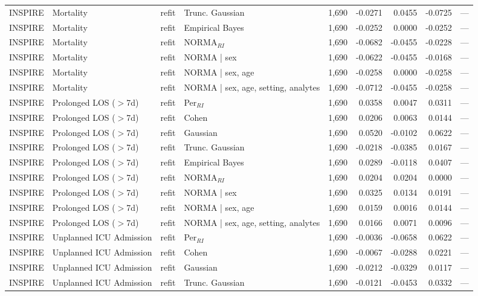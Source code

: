 \begin{table}[ht]
\begin{tabular}{ll l l r r r r r}
INSPIRE & Mortality & refit & Trunc. Gaussian & 1,690 & -0.0271 & 0.0455 & -0.0725 & --- \\
INSPIRE & Mortality & refit & Empirical Bayes & 1,690 & -0.0252 & 0.0000 & -0.0252 & --- \\
INSPIRE & Mortality & refit & NORMA$_{RI}$ & 1,690 & -0.0682 & -0.0455 & -0.0228 & --- \\
INSPIRE & Mortality & refit & NORMA | sex & 1,690 & -0.0622 & -0.0455 & -0.0168 & --- \\
INSPIRE & Mortality & refit & NORMA | sex, age & 1,690 & -0.0258 & 0.0000 & -0.0258 & --- \\
INSPIRE & Mortality & refit & NORMA | sex, age, setting, analytes & 1,690 & -0.0712 & -0.0455 & -0.0258 & --- \\
INSPIRE & Prolonged LOS ($>$7d) & refit & Per$_{RI}$ & 1,690 & 0.0358 & 0.0047 & 0.0311 & --- \\
INSPIRE & Prolonged LOS ($>$7d) & refit & Cohen & 1,690 & 0.0206 & 0.0063 & 0.0144 & --- \\
INSPIRE & Prolonged LOS ($>$7d) & refit & Gaussian & 1,690 & 0.0520 & -0.0102 & 0.0622 & --- \\
INSPIRE & Prolonged LOS ($>$7d) & refit & Trunc. Gaussian & 1,690 & -0.0218 & -0.0385 & 0.0167 & --- \\
INSPIRE & Prolonged LOS ($>$7d) & refit & Empirical Bayes & 1,690 & 0.0289 & -0.0118 & 0.0407 & --- \\
INSPIRE & Prolonged LOS ($>$7d) & refit & NORMA$_{RI}$ & 1,690 & 0.0204 & 0.0204 & 0.0000 & --- \\
INSPIRE & Prolonged LOS ($>$7d) & refit & NORMA | sex & 1,690 & 0.0325 & 0.0134 & 0.0191 & --- \\
INSPIRE & Prolonged LOS ($>$7d) & refit & NORMA | sex, age & 1,690 & 0.0159 & 0.0016 & 0.0144 & --- \\
INSPIRE & Prolonged LOS ($>$7d) & refit & NORMA | sex, age, setting, analytes & 1,690 & 0.0166 & 0.0071 & 0.0096 & --- \\
INSPIRE & Unplanned ICU Admission & refit & Per$_{RI}$ & 1,690 & -0.0036 & -0.0658 & 0.0622 & --- \\
INSPIRE & Unplanned ICU Admission & refit & Cohen & 1,690 & -0.0067 & -0.0288 & 0.0221 & --- \\
INSPIRE & Unplanned ICU Admission & refit & Gaussian & 1,690 & -0.0212 & -0.0329 & 0.0117 & --- \\
INSPIRE & Unplanned ICU Admission & refit & Trunc. Gaussian & 1,690 & -0.0121 & -0.0453 & 0.0332 & --- \\

\end{tabular}
\end{table}
